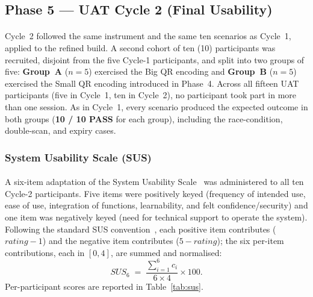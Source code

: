 \subsection{Phase 5 --- UAT Cycle 2 (Final Usability)}
\label{sect:results_uat2}

\paragraph{}Cycle~2 followed the same instrument and the same ten scenarios as Cycle~1, applied to the refined build. A second cohort of ten (10) participants was recruited, disjoint from the five Cycle-1 participants, and split into two groups of five: \textbf{Group~A} ($n=5$) exercised the Big QR encoding and \textbf{Group~B} ($n=5$) exercised the Small QR encoding introduced in Phase~4. Across all fifteen UAT participants (five in Cycle~1, ten in Cycle~2), no participant took part in more than one session. As in Cycle~1, every scenario produced the expected outcome in both groups (\textbf{10 / 10 PASS} for each group), including the race-condition, double-scan, and expiry cases.

\subsubsection{System Usability Scale (SUS)}
\label{sect:results_uat_sus}

\paragraph{}A six-item adaptation of the System Usability Scale~\cite{brooke1996sus} was administered to all ten Cycle-2 participants. Five items were positively keyed (frequency of intended use, ease of use, integration of functions, learnability, and felt confidence/security) and one item was negatively keyed (need for technical support to operate the system). Following the standard SUS convention~\cite{brooke1996sus, bangor2008sus}, each positive item contributes ($\textit{rating} - 1$) and the negative item contributes ($5 - \textit{rating}$); the six per-item contributions, each in $[0, 4]$, are summed and normalised:
\[
\textit{SUS}_{6} \;=\; \frac{\sum_{i=1}^{6} c_i}{6 \times 4} \times 100.
\]
Per-participant scores are reported in Table~\ref{tab:sus}.

